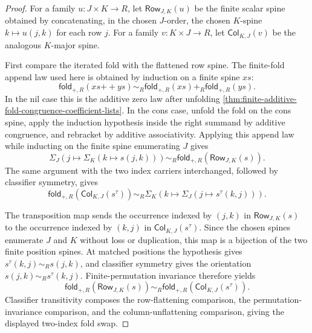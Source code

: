 \begin{proof}
For a family $u:J\times K\to R$, let $\mathsf{Row}_{J,K}(u)$ be the finite scalar spine obtained by concatenating, in the chosen $J$-order, the chosen $K$-spine $k\mapsto u(j,k)$ for each row $j$. For a family $v:K\times J\to R$, let $\mathsf{Col}_{K,J}(v)$ be the analogous $K$-major spine.

First compare the iterated fold with the flattened row spine. The finite-fold append law used here is obtained by induction on a finite spine $xs$:
$$
\mathsf{fold}_{+,R}(xs{++}ys)\sim_R\mathsf{fold}_{+,R}(xs)+_R\mathsf{fold}_{+,R}(ys).
$$
In the nil case this is the additive zero law after unfolding \autoref{thm:finite-additive-fold-congruence-coefficient-lists}. In the cons case, unfold the fold on the cons spine, apply the induction hypothesis inside the right summand by additive congruence, and rebracket by additive associativity. Applying this append law while inducting on the finite spine enumerating $J$ gives
$$
\Sigma_J(j\mapsto\Sigma_K(k\mapsto s(j,k)))\sim_R\mathsf{fold}_{+,R}(\mathsf{Row}_{J,K}(s)).
$$
The same argument with the two index carriers interchanged, followed by classifier symmetry, gives
$$
\mathsf{fold}_{+,R}(\mathsf{Col}_{K,J}(s^\tau))\sim_R\Sigma_K(k\mapsto\Sigma_J(j\mapsto s^\tau(k,j))).
$$

The transposition map sends the occurrence indexed by $(j,k)$ in $\mathsf{Row}_{J,K}(s)$ to the occurrence indexed by $(k,j)$ in $\mathsf{Col}_{K,J}(s^\tau)$. Since the chosen spines enumerate $J$ and $K$ without loss or duplication, this map is a bijection of the two finite position spines. At matched positions the hypothesis gives $s^\tau(k,j)\sim_Rs(j,k)$, and classifier symmetry gives the orientation $s(j,k)\sim_Rs^\tau(k,j)$. Finite-permutation invariance therefore yields
$$
\mathsf{fold}_{+,R}(\mathsf{Row}_{J,K}(s))\sim_R\mathsf{fold}_{+,R}(\mathsf{Col}_{K,J}(s^\tau)).
$$
Classifier transitivity composes the row-flattening comparison, the permutation-invariance comparison, and the column-unflattening comparison, giving the displayed two-index fold swap.
\end{proof}
